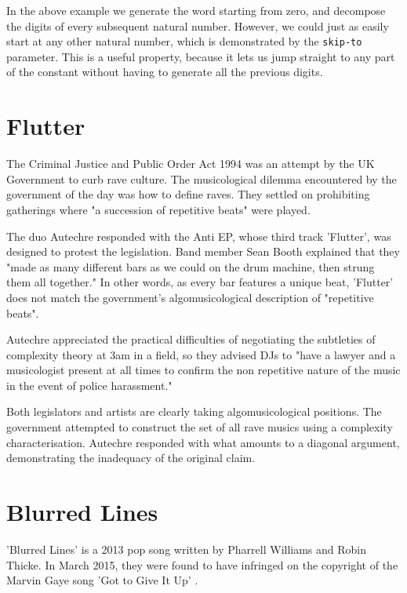 \documentclass[numbers, preprint]{sigplanconf}
\begin{document}
In the above example we generate the word starting from zero, and decompose the digits of
every subsequent natural number. However, we could just as easily start at any other natural number, which is demonstrated
by the \verb|skip-to| parameter. This is a useful property, because it lets us jump straight to any part of the constant
without having to generate all the previous digits.

\section{Flutter}

The Criminal Justice and Public Order Act 1994 was an attempt by the UK Government to curb rave culture. The musicological
dilemma encountered by the government of the day was how to define raves. They settled on prohibiting gatherings where
"a succession of repetitive beats" were played\cite{Joseph Gallivan on pop}.

The duo Autechre responded with the Anti EP\cite{Anti EP}, whose third track 'Flutter', was designed to protest the legislation.
Band member
Sean Booth explained that they "made as many different bars as we could on the drum machine, then strung them all together."
\cite{Joseph Gallivan on pop}
In other words, as every bar features a unique beat, 'Flutter' does not match the government's algomusicological description
of "repetitive beats".

Autechre appreciated the practical difficulties of negotiating the subtleties of complexity theory at 3am in a field,
so they advised DJs to "have a lawyer and a musicologist present at all times to confirm the non repetitive nature of the
music in the event of police harassment."\cite{Joseph Gallivan on pop}

Both legislators and artists are clearly taking algomusicological positions. The government attempted to construct the set
of all rave musics using a complexity characterisation. Autechre responded with what amounts to a diagonal argument, demonstrating
the inadequacy of the original claim.

\section{Blurred Lines}

'Blurred Lines' is a 2013 pop song written by Pharrell Williams and Robin Thicke\cite{Blurred Lines}. In March 2015,
they were found to have infringed on the copyright of the Marvin Gaye song 'Got to Give It Up'\cite{Got to Give It Up}
\cite{USA Today}.
\end{document}
